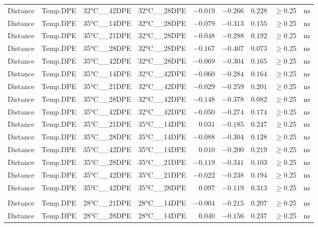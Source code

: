\documentclass[
]{article}
\begin{document}
\begin{longtable}{llllrrrrl}
Distance & Temp.DPE & 32°C\_\_42DPE & 32°C\_\_28DPE & $-0.019$ & $-0.266$ & $0.228$ & $\geq$0.25 & ns \\ 
Distance & Temp.DPE & 35°C\_\_14DPE & 32°C\_\_28DPE & $-0.079$ & $-0.313$ & $0.155$ & $\geq$0.25 & ns \\ 
Distance & Temp.DPE & 35°C\_\_21DPE & 32°C\_\_28DPE & $-0.048$ & $-0.288$ & $0.192$ & $\geq$0.25 & ns \\ 
Distance & Temp.DPE & 35°C\_\_28DPE & 32°C\_\_28DPE & $-0.167$ & $-0.407$ & $0.073$ & $\geq$0.25 & ns \\ 
Distance & Temp.DPE & 35°C\_\_42DPE & 32°C\_\_28DPE & $-0.069$ & $-0.304$ & $0.165$ & $\geq$0.25 & ns \\ 
Distance & Temp.DPE & 35°C\_\_14DPE & 32°C\_\_42DPE & $-0.060$ & $-0.284$ & $0.164$ & $\geq$0.25 & ns \\ 
Distance & Temp.DPE & 35°C\_\_21DPE & 32°C\_\_42DPE & $-0.029$ & $-0.259$ & $0.201$ & $\geq$0.25 & ns \\ 
Distance & Temp.DPE & 35°C\_\_28DPE & 32°C\_\_42DPE & $-0.148$ & $-0.378$ & $0.082$ & $\geq$0.25 & ns \\ 
Distance & Temp.DPE & 35°C\_\_42DPE & 32°C\_\_42DPE & $-0.050$ & $-0.274$ & $0.174$ & $\geq$0.25 & ns \\ 
Distance & Temp.DPE & 35°C\_\_21DPE & 35°C\_\_14DPE & $0.031$ & $-0.185$ & $0.247$ & $\geq$0.25 & ns \\ 
Distance & Temp.DPE & 35°C\_\_28DPE & 35°C\_\_14DPE & $-0.088$ & $-0.304$ & $0.128$ & $\geq$0.25 & ns \\ 
Distance & Temp.DPE & 35°C\_\_42DPE & 35°C\_\_14DPE & $0.010$ & $-0.200$ & $0.219$ & $\geq$0.25 & ns \\ 
Distance & Temp.DPE & 35°C\_\_28DPE & 35°C\_\_21DPE & $-0.119$ & $-0.341$ & $0.103$ & $\geq$0.25 & ns \\ 
Distance & Temp.DPE & 35°C\_\_42DPE & 35°C\_\_21DPE & $-0.022$ & $-0.238$ & $0.194$ & $\geq$0.25 & ns \\ 
Distance & Temp.DPE & 35°C\_\_42DPE & 35°C\_\_28DPE & $0.097$ & $-0.119$ & $0.313$ & $\geq$0.25 & ns \\ 
\midrule\addlinespace[2.5pt]
\multicolumn{9}{l}{canberra} \\ 
\midrule\addlinespace[2.5pt]
Distance & Temp.DPE & 28°C\_\_21DPE & 28°C\_\_14DPE & $-0.004$ & $-0.215$ & $0.207$ & $\geq$0.25 & ns \\ 
Distance & Temp.DPE & 28°C\_\_28DPE & 28°C\_\_14DPE & $0.040$ & $-0.156$ & $0.237$ & $\geq$0.25 & ns \\ 

\end{longtable}
\end{document}
